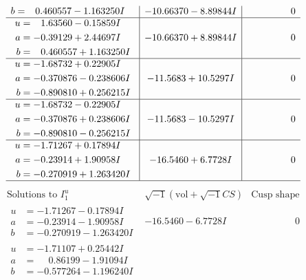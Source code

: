 \documentclass[1p]{elsarticle_modified}
\theoremstyle{definition}
\newcommand{\I}{\sqrt{-1}}
\begin{document}
$$\begin{array}{c|c|c}
\begin{aligned}
b &= \phantom{-}0.460557 - 1.163250 I\end{aligned}
 & -10.66370 - 8.89844 I & \phantom{-0.000000 } 0 \\ \hline\begin{aligned}
u &= \phantom{-}1.63560 - 0.15859 I \\
a &= -0.39129 + 2.44697 I \\
b &= \phantom{-}0.460557 + 1.163250 I\end{aligned}
 & -10.66370 + 8.89844 I & \phantom{-0.000000 } 0 \\ \hline\begin{aligned}
u &= -1.68732 + 0.22905 I \\
a &= -0.370876 - 0.238606 I \\
b &= -0.890810 + 0.256215 I\end{aligned}
 & -11.5683 + 10.5297 I & \phantom{-0.000000 } 0 \\ \hline\begin{aligned}
u &= -1.68732 - 0.22905 I \\
a &= -0.370876 + 0.238606 I \\
b &= -0.890810 - 0.256215 I\end{aligned}
 & -11.5683 - 10.5297 I & \phantom{-0.000000 } 0 \\ \hline\begin{aligned}
u &= -1.71267 + 0.17894 I \\
a &= -0.23914 + 1.90958 I \\
b &= -0.270919 + 1.263420 I\end{aligned}
 & -16.5460 + 6.7728 I & \phantom{-0.000000 } 0\\
 \hline 
 \end{array}$$\newpage$$\begin{array}{c|c|c}  
\text{Solutions to }I^u_{1}& \I (\text{vol} + \sqrt{-1}CS) & \text{Cusp shape}\\
 \hline 
\begin{aligned}
u &= -1.71267 - 0.17894 I \\
a &= -0.23914 - 1.90958 I \\
b &= -0.270919 - 1.263420 I\end{aligned}
 & -16.5460 - 6.7728 I & \phantom{-0.000000 } 0 \\ \hline\begin{aligned}
u &= -1.71107 + 0.25442 I \\
a &= \phantom{-}0.86199 - 1.91094 I \\
b &= -0.577264 - 1.196240 I\end{aligned}

\end{array}$$
\end{document}
